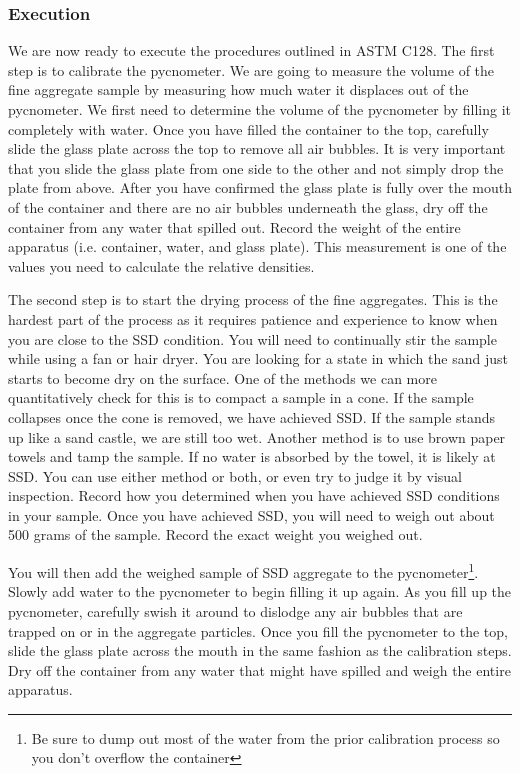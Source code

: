 \documentclass[12pt]{article}
\begin{document}
\subsubsection{Execution}
We are now ready to execute the procedures outlined in ASTM C128. The first step is to calibrate the pycnometer. We are going to measure the volume of the fine aggregate sample by measuring how much water it displaces out of the pycnometer. We first need to determine the volume of the pycnometer by filling it completely with water. Once you have filled the container to the top, carefully slide the glass plate across the top to remove all air bubbles. It is very important that you slide the glass plate from one side to the other and not simply drop the plate from above. After you have confirmed the glass plate is fully over the mouth of the container and there are no air bubbles underneath the glass, dry off the container from any water that spilled out. Record the weight of the entire apparatus (i.e. container, water, and glass plate). This measurement is one of the values you need to calculate the relative densities.

The second step is to start the drying process of the fine aggregates. This is the hardest part of the process as it requires patience and experience to know when you are close to the SSD condition. You will need to continually stir the sample while using a fan or hair dryer. You are looking for a state in which the sand just starts to become dry on the surface. One of the methods we can more quantitatively check for this is to compact a sample in a cone. If the sample collapses once the cone is removed, we have achieved SSD. If the sample stands up like a sand castle, we are still too wet. Another method is to use brown paper towels and tamp the sample. If no water is absorbed by the towel, it is likely at SSD. You can use either method or both, or even try to judge it by visual inspection. Record how you determined when you have achieved SSD conditions in your sample. Once you have achieved SSD, you will need to weigh out about 500 grams of the sample. Record the exact weight you weighed out.

You will then add the weighed sample of SSD aggregate to the pycnometer\footnote{Be sure to dump out most of the water from the prior calibration process so you don't overflow the container}. Slowly add water to the pycnometer to begin filling it up again. As you fill up the pycnometer, carefully swish it around to dislodge any air bubbles that are trapped on or in the aggregate particles. Once you fill the pycnometer to the top, slide the glass plate across the mouth in the same fashion as the calibration steps. Dry off the container from any water that might have spilled and weigh the entire apparatus.
\end{document}
